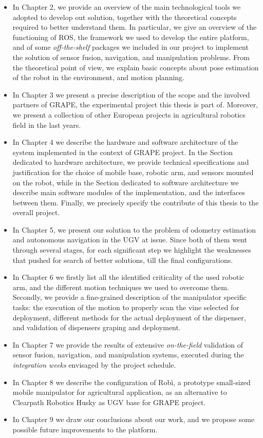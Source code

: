 \begin{itemize}
	\item In Chapter 2, we provide an overview of the main technological tools we adopted to develop out solution, together with the theoretical concepts required to better understand them. In particular, we give an overview of the functioning of \ac{ROS}, the framework we used to develop the entire platform, and of some \textit{off-the-shelf} packages we included in our project to implement the solution of sensor fusion, navigation, and manipulation problems. From the theoretical point of view, we explain basic concepts about pose estimation of the robot in the environment, and motion planning.
	\item In Chapter 3 we present a precise description of the scope and the involved partners of \ac{GRAPE}, the experimental project this thesis is part of. Moreover, we present a collection of other European projects in agricultural robotics field in the last years.
	\item In Chapter 4 we describe the hardware and software architecture of the system implemented in the context of \ac{GRAPE} project. In the Section dedicated to hardware architecture, we provide technical specifications and justification for the choice of mobile base, robotic arm, and sensors mounted on the robot, while in the Section dedicated to software architecture we describe main software modules of the implementation, and the interfaces between them. Finally, we precisely specify the contribute of this thesis to the overall project.
	\item In Chapter 5, we present our solution to the problem of odometry estimation and autonomous navigation in the \ac{UGV} at issue. Since both of them went through several stages, for each significant step we highlight the weaknesses that pushed for search of better solutions, till the final configurations.
	\item In Chapter 6 we firstly list all the identified criticality of the used robotic arm, and the different motion techniques we used to overcome them. Secondly, we provide a fine-grained description of the manipulator specific tasks: the execution of the motion to properly scan the vine selected for deployment, different methods for the actual deployment of the dispenser, and validation of dispensers graping and deployment.
	\item In Chapter 7 we provide the results of extensive \textit{on-the-field} validation of sensor fusion, navigation, and manipulation systems, executed during the \textit{integration weeks} envisaged by the project schedule.
	\item In Chapter 8 we describe the configuration of Robì, a prototype small-sized mobile manipulator for agricultural application, as an alternative to Clearpath Robotics Husky as \ac{UGV} base for \ac{GRAPE} project.
	\item In Chapter 9 we draw our conclusions about our work, and we propose some possible future improvements to the platform.

\end{itemize}











